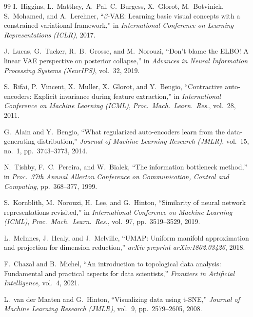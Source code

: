 \documentclass[11pt,a4paper]{jsarticle}
\begin{document}
\begin{thebibliography}{99}
I.~Higgins, L.~Matthey, A.~Pal, C.~Burgess, X.~Glorot, M.~Botvinick,
S.~Mohamed, and A.~Lerchner,
``$\beta$-VAE: Learning basic visual concepts with a constrained variational framework,''
in \textit{International Conference on Learning Representations (ICLR)}, 2017.

J.~Lucas, G.~Tucker, R.~B.~Grosse, and M.~Norouzi,
``Don't blame the ELBO! A linear VAE perspective on posterior collapse,''
in \textit{Advances in Neural Information Processing Systems (NeurIPS)}, vol.~32, 2019.

S.~Rifai, P.~Vincent, X.~Muller, X.~Glorot, and Y.~Bengio,
``Contractive auto-encoders: Explicit invariance during feature extraction,''
in \textit{International Conference on Machine Learning (ICML)},
\textit{Proc.~Mach.~Learn.~Res.}, vol.~28, 2011.

G.~Alain and Y.~Bengio,
``What regularized auto-encoders learn from the data-generating distribution,''
\textit{Journal of Machine Learning Research (JMLR)}, vol.~15, no.~1,
pp.~3743--3773, 2014.

N.~Tishby, F.~C.~Pereira, and W.~Bialek,
``The information bottleneck method,''
in \textit{Proc.~37th Annual Allerton Conference on Communication, Control and Computing},
pp.~368--377, 1999.

S.~Kornblith, M.~Norouzi, H.~Lee, and G.~Hinton,
``Similarity of neural network representations revisited,''
in \textit{International Conference on Machine Learning (ICML)},
\textit{Proc.~Mach.~Learn.~Res.}, vol.~97, pp.~3519--3529, 2019.

L.~McInnes, J.~Healy, and J.~Melville,
``UMAP: Uniform manifold approximation and projection for dimension reduction,''
\textit{arXiv preprint arXiv:1802.03426}, 2018.

F.~Chazal and B.~Michel,
``An introduction to topological data analysis: Fundamental and practical aspects
for data scientists,''
\textit{Frontiers in Artificial Intelligence}, vol.~4, 2021.

L.~van der Maaten and G.~Hinton,
``Visualizing data using t-SNE,''
\textit{Journal of Machine Learning Research (JMLR)}, vol.~9,
pp.~2579--2605, 2008.

\end{thebibliography}

\appendix
\end{document}

